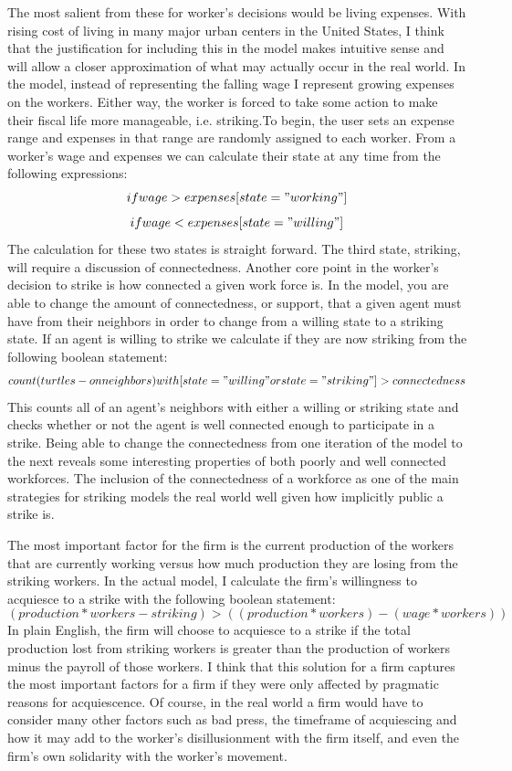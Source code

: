 \documentclass[11pt]{article}
\begin{document}
The most salient from these for worker's decisions would be living expenses. With rising cost of living in many major urban centers in the United States, I think that the justification for including this in the model makes intuitive sense and will allow a closer approximation of what may actually occur in the real world. In the model, instead of representing the falling wage I represent growing expenses on the workers. Either way, the worker is forced to take some action to make their fiscal life more manageable, i.e. striking.To begin, the user sets an expense range and expenses in that range are randomly assigned to each worker. From a worker's wage and expenses we can calculate their state at any time from the following expressions:
$$if wage > expenses [state="working"]$$
$$if wage < expenses [state="willing"]$$
The calculation for these two states is straight forward. The third state, striking, will require a discussion of connectedness.
Another core point in the worker's decision to strike is how connected a given work force is. In the model, you are able to change the amount of connectedness, or support, that a given agent must have from their neighbors in order to change from a willing state to a striking state. If an agent is willing to strike we calculate if they are now striking from the following boolean statement:
$$count (turtles-on neighbors) with [ state = "willing" or state = "striking" ] > connectedness$$
This counts all of an agent's neighbors with either a willing or striking state and checks whether or not the agent is well connected enough to participate in a strike. Being able to change the connectedness from one iteration of the model to the next reveals some interesting properties of both poorly and well connected workforces. The inclusion of the connectedness of a workforce as one of the main strategies for striking models the real world well given how implicitly public a strike is. 

The most important factor for the firm is the current production of the workers that are currently working versus how much production they are losing from the striking workers. In the actual model, I calculate the firm's willingness to acquiesce to a strike with the following boolean statement:
$$(production* workers-striking) > ((production * workers) - (wage * workers))$$ 
In plain English, the firm will choose to acquiesce to a strike if the total production lost from striking workers is greater than the production of workers minus the payroll of those workers. I think that this solution for a firm captures the most important factors for a firm if they were only affected by pragmatic reasons for acquiescence. Of course, in the real world a firm would have to consider many other factors such as bad press, the timeframe of acquiescing and how it may add to the worker's disillusionment with the firm itself, and even the firm's own solidarity with the worker's movement.
\end{document}
